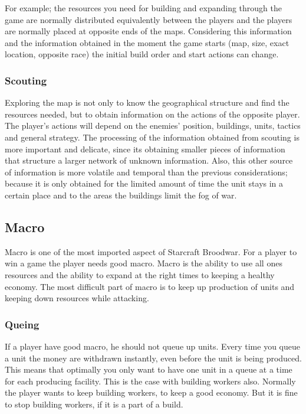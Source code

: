 				For example; the resources you need for building and expanding through the game are normally distributed
				equivalently between the players and the players are normally placed at opposite ends of the maps. 
				Considering this information and the information obtained in the moment the game starts 
				(map, size, exact location, opposite race) the initial build order and start actions can change. 
		
			\subsubsection*{Scouting}
				Exploring the map is not only to know the geographical structure and find the resources needed, 
				but to obtain information on the actions of the opposite player. The player's actions will depend on
				the enemies' position, buildings, units, tactics and general strategy. The processing of the information 
				obtained from scouting is more important and delicate, since its obtaining smaller pieces of information 
				that structure a larger network of unknown information. Also, this other source of information 
				is more volatile and temporal than the previous considerations; because it is only obtained for the 
				limited amount of time the unit stays in a certain place and to the areas the buildings limit the fog of war.
				
	\subsection*{Macro}
		Macro is one of the most imported aspect of Starcraft Broodwar. For a player to win a game the player needs good macro. 
		Macro is the ability to use all ones resources and the ability to expand at the right times to keeping a healthy economy.
		The most difficult part of macro is to keep up production of units and keeping down resources while attacking.  
			
			\subsubsection*{Queing}
				If a player have good macro, he should not queue up units. 
				Every time you queue a unit the money are withdrawn instantly, even before 
				the unit is being produced. This means that optimally you only want to have one unit in a queue at a time for each producing facility.
				This is the case with building workers also. Normally the player wants to keep building workers, to keep a good economy.
				But it is fine to stop building workers, if it is a part of a build.
				

